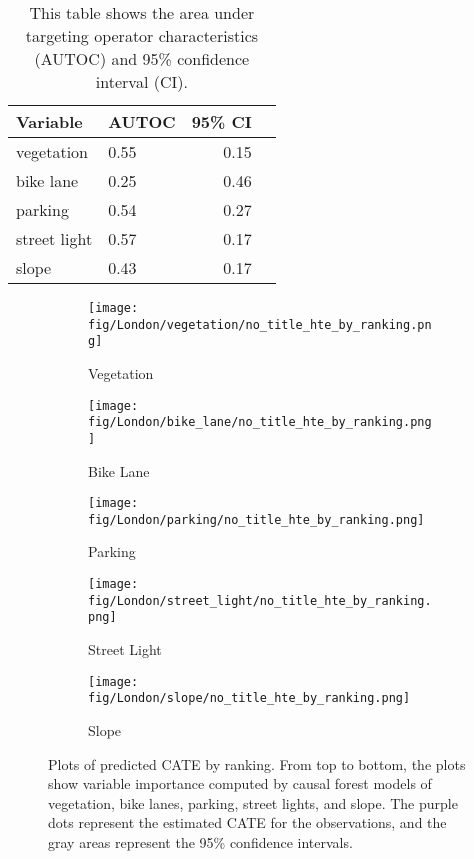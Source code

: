 \documentclass[preprint,12pt, authoryear]{elsarticle}
\begin{document}
\begin{table}\centering
\caption{This table shows the area under targeting operator characteristics (AUTOC) and 95\% confidence interval (CI).}
\label{result:tab:autoc}
\scriptsize
\begin{tabular}{llrr}\toprule
Variable & AUTOC & 95\% CI \\\midrule
vegetation & 0.55 & 0.15 \\
bike lane & 0.25 & 0.46 \\
parking & 0.54 & 0.27 \\
street light & 0.57 & 0.17 \\
slope & 0.43 & 0.17 \\
\bottomrule
\end{tabular}
\end{table}

\begin{figure}
    \centering

    \begin{subfigure}{.7\textwidth}
        \centering
        \texttt{[image: fig/London/vegetation/no\_title\_hte\_by\_ranking.png]}
        \caption*{Vegetation}
    \end{subfigure}%

    \begin{subfigure}{.7\textwidth}
        \centering
        \texttt{[image: fig/London/bike\_lane/no\_title\_hte\_by\_ranking.png]}
        \caption*{Bike Lane}
    \end{subfigure}%

    \begin{subfigure}{.7\textwidth}
        \centering
        \texttt{[image: fig/London/parking/no\_title\_hte\_by\_ranking.png]}
        \caption*{Parking}
    \end{subfigure}

    \begin{subfigure}{.7\textwidth}
        \centering
        \texttt{[image: fig/London/street\_light/no\_title\_hte\_by\_ranking.png]}
        \caption*{Street Light}
    \end{subfigure}
    
    \begin{subfigure}{.7\textwidth}
        \centering
        \texttt{[image: fig/London/slope/no\_title\_hte\_by\_ranking.png]}
        \caption*{Slope}
    \end{subfigure}

    \caption{Plots of predicted CATE by ranking. From top to bottom, the plots show variable importance computed by causal forest models of vegetation, bike lanes, parking, street lights, and slope. The purple dots represent the estimated CATE for the observations, and the gray areas represent the 95\% confidence intervals.}
    \label{result:fig:rank_cate}
\end{figure}
\end{document}
